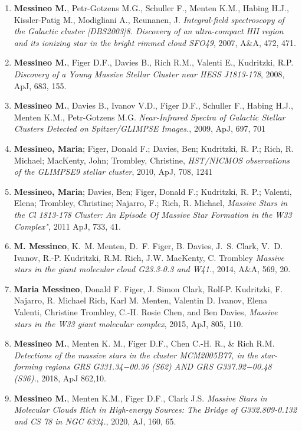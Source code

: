 \documentclass[final,11pt,onecolumn,a4paper,twoside]{scrbook_gj}
\begin{document}
\begin{enumerate}

\item  {\bf Messineo M.}, Petr-Gotzens M.G., Schuller F., Menten K.M., Habing H.J., Kissler-Patig M., Modigliani A., Reunanen, J.
{\it Integral-field spectroscopy of the Galactic cluster [DBS2003]8. Discovery of an ultra-compact HII region and its ionizing star in 
the bright rimmed cloud SFO49},  2007, A\&A, 472, 471.


\item  {\bf Messineo M.}, Figer D.F., Davies B., Rich R.M.,  Valenti  E., Kudritzki, R.P.
{\it Discovery of a Young Massive Stellar Cluster near HESS J1813-178}, 2008, ApJ, 683, 155.

\item  {\bf Messineo M.}, Davies B., Ivanov V.D., Figer D.F., Schuller F., Habing H.J.,
Menten K.M., Petr-Gotzens M.G. 
{\it Near-Infrared Spectra of Galactic Stellar Clusters Detected on Spitzer/GLIMPSE Images.}, 2009, ApJ, 697, 701


\item {\bf Messineo, Maria}; Figer, Donald F.; Davies, Ben; Kudritzki, R. P.; Rich, R. Michael; MacKenty, John; 
Trombley, Christine, {\it HST/NICMOS observations of the GLIMPSE9 stellar cluster}, 2010, ApJ, 708, 1241

\item {\bf Messineo, Maria}; Davies, Ben; Figer, Donald F.; Kudritzki, R. P.; Valenti, Elena; Trombley, Christine; Najarro, F.; Rich, R. Michael,
{\it Massive Stars in the Cl 1813-178 Cluster: An Episode Of Massive Star Formation 
in the W33 Complex",}  2011 ApJ, 733, 41.

     
\item {\bf M. Messineo}, K.~M. Menten, D.~F. Figer, B. Davies, J.~S. Clark, V.~D. Ivanov,
R.-P. Kudritzki, R.M. Rich, J.W. MacKenty, C. Trombley
{\it  Massive stars in the giant molecular cloud G23.3-0.3 and W41.}, 2014,  A\&A, 569, 20.


\item {\bf Maria Messineo}, Donald F. Figer, J. Simon Clark, Rolf-P. Kudritzki, F. Najarro, R. Michael Rich,
Karl M. Menten, Valentin D. Ivanov, Elena Valenti, Christine Trombley, C.-H. Rosie Chen, and Ben Davies,
{\it Massive stars in the W33 giant molecular complex}, 2015, ApJ, 805, 110.
    
\item  {\bf Messineo M.}, Menten K. M., Figer D.F., Chen C.-H. R., \& Rich R.M.
    {\it Detections of the massive stars in the cluster MCM2005B77, in the star-forming
    regions  GRS G331.34−00.36 (S62) AND GRS G337.92−00.48 (S36).}, 2018, ApJ 862,10.
     


\item {\bf Messineo M.}, Menten K.M., Figer D.F., Clark J.S. 
{\it Massive Stars in Molecular Clouds Rich in High-energy Sources: 
The Bridge of G332.809-0.132 and CS 78 in NGC 6334.}, 
2020, AJ, 160, 65.
\end{enumerate}
\end{document}
